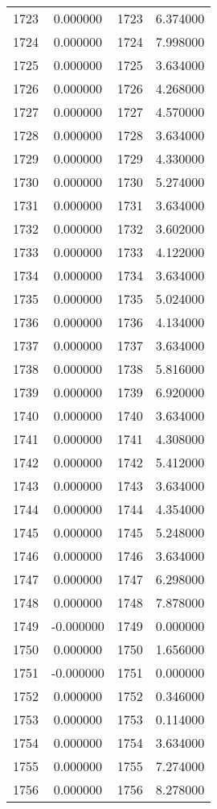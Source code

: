 \documentclass[12pt]{article}
\begin{document}
\begin{longtable}{@{}cccc@{}}
1723 & 0.000000 & 1723 & 6.374000 \\
1724 & 0.000000 & 1724 & 7.998000 \\
1725 & 0.000000 & 1725 & 3.634000 \\
1726 & 0.000000 & 1726 & 4.268000 \\
1727 & 0.000000 & 1727 & 4.570000 \\
1728 & 0.000000 & 1728 & 3.634000 \\
1729 & 0.000000 & 1729 & 4.330000 \\
1730 & 0.000000 & 1730 & 5.274000 \\
1731 & 0.000000 & 1731 & 3.634000 \\
1732 & 0.000000 & 1732 & 3.602000 \\
1733 & 0.000000 & 1733 & 4.122000 \\
1734 & 0.000000 & 1734 & 3.634000 \\
1735 & 0.000000 & 1735 & 5.024000 \\
1736 & 0.000000 & 1736 & 4.134000 \\
1737 & 0.000000 & 1737 & 3.634000 \\
1738 & 0.000000 & 1738 & 5.816000 \\
1739 & 0.000000 & 1739 & 6.920000 \\
1740 & 0.000000 & 1740 & 3.634000 \\
1741 & 0.000000 & 1741 & 4.308000 \\
1742 & 0.000000 & 1742 & 5.412000 \\
1743 & 0.000000 & 1743 & 3.634000 \\
1744 & 0.000000 & 1744 & 4.354000 \\
1745 & 0.000000 & 1745 & 5.248000 \\
1746 & 0.000000 & 1746 & 3.634000 \\
1747 & 0.000000 & 1747 & 6.298000 \\
1748 & 0.000000 & 1748 & 7.878000 \\
1749 & -0.000000 & 1749 & 0.000000 \\
1750 & 0.000000 & 1750 & 1.656000 \\
1751 & -0.000000 & 1751 & 0.000000 \\
1752 & 0.000000 & 1752 & 0.346000 \\
1753 & 0.000000 & 1753 & 0.114000 \\
1754 & 0.000000 & 1754 & 3.634000 \\
1755 & 0.000000 & 1755 & 7.274000 \\
1756 & 0.000000 & 1756 & 8.278000 \\

\end{longtable}
\end{document}
